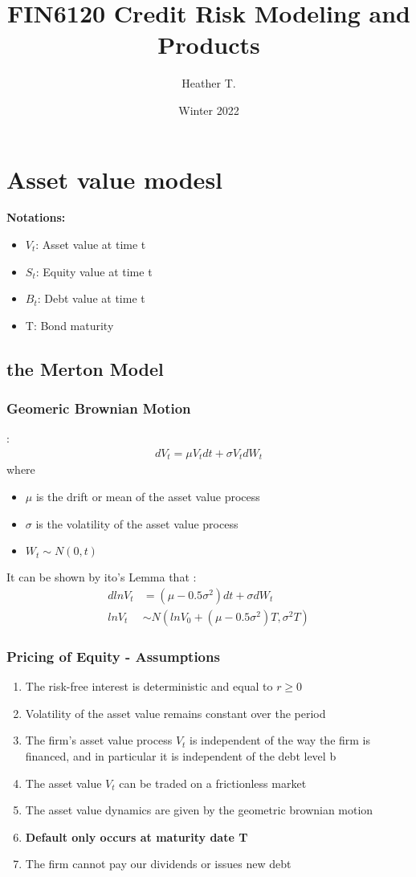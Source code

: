 \documentclass{article}
\title{FIN6120 Credit Risk Modeling and Products}
\author{Heather T.}
\date{Winter 2022}
\theoremstyle{definition}
\theoremstyle{thrm}
\theoremstyle{lma}
\theoremstyle{ppst}
\theoremstyle{crlr}
\begin{document}
\maketitle	
\tableofcontents
\pagebreak

\section{Asset value modesl}
\textbf{Notations:}
\begin{itemize}
	\item $V_t$: Asset value at time t
	\item $S_t$: Equity value at time t
	\item $B_t$: Debt value at time t
	\item T: Bond maturity
\end{itemize}
\subsection{the Merton Model}
\subsubsection{Geomeric Brownian Motion}:
\begin{align*}
	dV_t = \mu V_tdt+\sigma V_tdW_t
\end{align*}
where 
\begin{itemize}
	\item $\mu$ is the drift or mean of the asset value process
	\item $\sigma$ is the volatility of the asset value process
	\item $W_t \sim N(0,t)$
\end{itemize}
It can be shown by ito's Lemma that :
\begin{align*}
	dlnV_t &= (\mu - 0.5\sigma^2)dt+\sigma d W_t\\
	lnV_t &\sim N(lnV_0+(\mu - 0.5 \sigma^2)T, \sigma^2T)
\end{align*}
\subsubsection{Pricing of Equity - Assumptions}
\begin{enumerate}
	\item The risk-free interest is deterministic and equal to $r\geq 0$
	\item Volatility of the asset value remains constant over the period
	\item The firm's asset value process $V_t$ is independent of the way the firm is financed, and in particular it is independent of the debt level b
	\item The asset value $V_t$ can be traded on a frictionless market
	\item The asset value dynamics are given by the geometric brownian motion
	\item \textbf{Default only occurs at maturity date T}
	\item The firm cannot pay our dividends or issues new debt
\end{enumerate}
\end{document}
